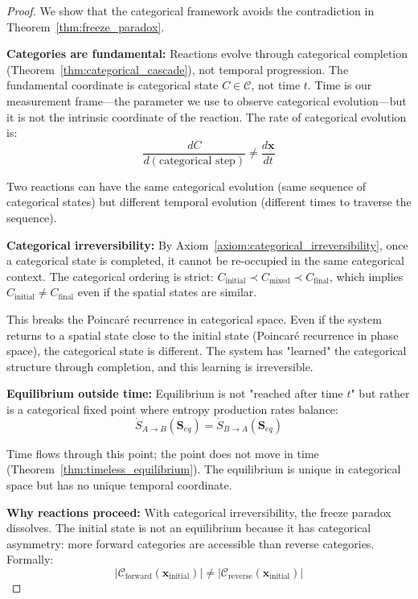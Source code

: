 \documentclass[12pt,a4paper]{article}
\theoremstyle{definition}
\theoremstyle{remark}
\newcommand{\catspace}{\mathcal{C}}
\begin{document}
\begin{proof}
We show that the categorical framework avoids the contradiction in Theorem~\ref{thm:freeze_paradox}.

\textbf{Categories are fundamental:}
Reactions evolve through categorical completion (Theorem~\ref{thm:categorical_cascade}), not temporal progression. The fundamental coordinate is categorical state $C \in \catspace$, not time $t$. Time is our measurement frame—the parameter we use to observe categorical evolution—but it is not the intrinsic coordinate of the reaction. The rate of categorical evolution is:
\begin{equation}
\frac{dC}{d(\text{categorical step})} \neq \frac{d\mathbf{x}}{dt}
\end{equation}

Two reactions can have the same categorical evolution (same sequence of categorical states) but different temporal evolution (different times to traverse the sequence).

\textbf{Categorical irreversibility:}
By Axiom~\ref{axiom:categorical_irreversibility}, once a categorical state is completed, it cannot be re-occupied in the same categorical context. The categorical ordering is strict: $C_{\text{initial}} \prec C_{\text{mixed}} \prec C_{\text{final}}$, which implies $C_{\text{initial}} \neq C_{\text{final}}$ even if the spatial states are similar.

This breaks the Poincaré recurrence in categorical space. Even if the system returns to a spatial state close to the initial state (Poincaré recurrence in phase space), the categorical state is different. The system has "learned" the categorical structure through completion, and this learning is irreversible.

\textbf{Equilibrium outside time:}
Equilibrium is not "reached after time $t$" but rather is a categorical fixed point where entropy production rates balance:
\begin{equation}
\dot{S}_{A \to B}(\mathbf{S}_{eq}) = \dot{S}_{B \to A}(\mathbf{S}_{eq})
\end{equation}

Time flows through this point; the point does not move in time (Theorem~\ref{thm:timeless_equilibrium}). The equilibrium is unique in categorical space but has no unique temporal coordinate.

\textbf{Why reactions proceed:}
With categorical irreversibility, the freeze paradox dissolves. The initial state is not an equilibrium because it has categorical asymmetry: more forward categories are accessible than reverse categories. Formally:
\begin{equation}
|\mathcal{C}_{\text{forward}}(\mathbf{x}_{\text{initial}})| \neq |\mathcal{C}_{\text{reverse}}(\mathbf{x}_{\text{initial}})|
\end{equation}


\end{proof}
\end{document}
